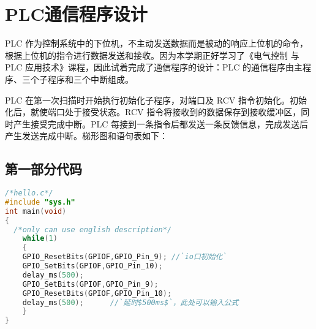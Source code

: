 \documentclass[forprint]{CSUBachelor}
\begin{document}
\iffalse	%
\begin{enumerate}[itemsep=0pt,parsep=0pt,label=(\arabic*)]
	\item  速度闭环控制、电流闭环控制、力矩控制、弱磁控制；
	\item  S 形上升曲线（减少提升机钢丝绳抖动）；
	\item  全数字控制自诊断和故障显示（PLC+触摸屏）；
\end{enumerate}
\fi 


\chapter{PLC通信程序设计}

PLC 作为控制系统中的下位机，不主动发送数据而是被动的响应上位机的命令，根据上位机的指令进行数据发送和接收。因为本学期正好学习了《电气控制 与 PLC 应用技术》课程，因此试着完成了通信程序的设计：PLC 的通信程序由主程序、三个子程序和三个中断组成。 

PLC 在第一次扫描时开始执行初始化子程序，对端口及 RCV 指令初始化。初始化后，就使端口处于接受状态。RCV 指令将接收到的数据保存到接收缓冲区，同时产生接受完成中断。PLC 每接到一条指令后都发送一条反馈信息，完成发送后产生发送完成中断。梯形图和语句表如下：

\section{第一部分代码}

\lstset{columns=flexable,numbers=left,numberstyle=\footnotesize,escapechar=`,xleftmargin=2em,xrightmargin=2em, aboveskip=0em}

\begin{spacing}{1}
\begin{lstlisting}[language=C]
/*hello.c*/
#include "sys.h"
int main(void)
{ 
  /*only can use english description*/
	while(1)
	{
	GPIO_ResetBits(GPIOF,GPIO_Pin_9); //`io口初始化`
	GPIO_SetBits(GPIOF,GPIO_Pin_10); 
	delay_ms(500); 
	GPIO_SetBits(GPIOF,GPIO_Pin_9);
	GPIO_ResetBits(GPIOF,GPIO_Pin_10);
	delay_ms(500); 		//`延时$500ms$`，此处可以输入公式
	}	  
}
\end{lstlisting}
\end{spacing}

\cleardoublepage	%
\end{document}
